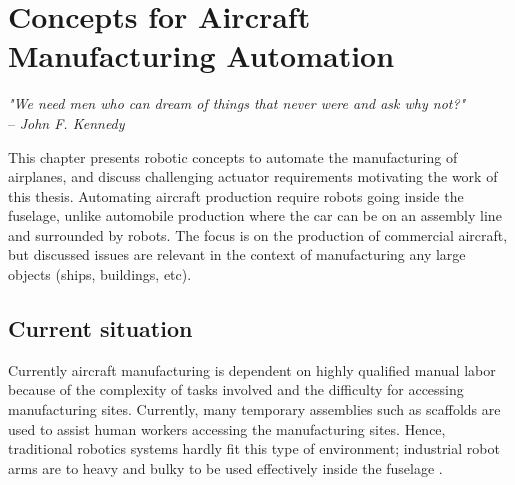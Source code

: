 \chapter{Concepts for Aircraft Manufacturing Automation}
\label{sec:VisionForAircraftManufacturingAutomation}

\begin{flushright}
{
\textit{"We need men who can dream of things that never were and ask why not?"}\\
  -- \emph{John F. Kennedy}
%
}
\end{flushright}
\vspace{+10pt}

This chapter presents robotic concepts to automate the manufacturing of airplanes, and discuss challenging actuator requirements motivating the work of this thesis. Automating aircraft production require robots going inside the fuselage, unlike automobile production where the car can be on an assembly line and surrounded by robots. The focus is on the production of commercial aircraft, but discussed issues are relevant in the context of manufacturing any large objects (ships, buildings, etc).



\section{Current situation}
\label{sec:CurrentSituation}


Currently aircraft manufacturing is dependent on highly qualified manual labor because of the complexity of tasks involved and the difficulty for accessing manufacturing sites. Currently, many temporary assemblies such as scaffolds are used to assist human workers accessing the manufacturing sites. Hence, traditional robotics systems hardly fit this type of environment; industrial robot arms are to heavy and bulky to be used effectively inside the fuselage \cite{parietti_supernumerary_2014} \cite{menon_design_2011}. 

